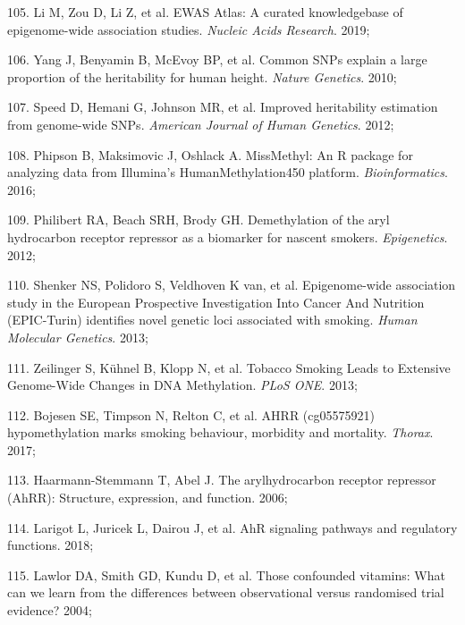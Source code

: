 \documentclass[11pt,oneside]{bristolthesis}
\newenvironment{cslreferences}%
  {}%
  {\par}
\begin{document}
\begin{cslreferences}
\leavevmode\hypertarget{ref-Li2019}{}%
105. Li M, Zou D, Li Z, et al. EWAS Atlas: A curated knowledgebase of epigenome-wide association studies. \emph{Nucleic Acids Research}. 2019;

\leavevmode\hypertarget{ref-Yang2010}{}%
106. Yang J, Benyamin B, McEvoy BP, et al. Common SNPs explain a large proportion of the heritability for human height. \emph{Nature Genetics}. 2010;

\leavevmode\hypertarget{ref-Speed2012}{}%
107. Speed D, Hemani G, Johnson MR, et al. Improved heritability estimation from genome-wide SNPs. \emph{American Journal of Human Genetics}. 2012;

\leavevmode\hypertarget{ref-Phipson2016}{}%
108. Phipson B, Maksimovic J, Oshlack A. MissMethyl: An R package for analyzing data from Illumina's HumanMethylation450 platform. \emph{Bioinformatics}. 2016;

\leavevmode\hypertarget{ref-Philibert2012}{}%
109. Philibert RA, Beach SRH, Brody GH. Demethylation of the aryl hydrocarbon receptor repressor as a biomarker for nascent smokers. \emph{Epigenetics}. 2012;

\leavevmode\hypertarget{ref-Shenker2013}{}%
110. Shenker NS, Polidoro S, Veldhoven K van, et al. Epigenome-wide association study in the European Prospective Investigation Into Cancer And Nutrition (EPIC-Turin) identifies novel genetic loci associated with smoking. \emph{Human Molecular Genetics}. 2013;

\leavevmode\hypertarget{ref-Zeilinger2013}{}%
111. Zeilinger S, Kühnel B, Klopp N, et al. Tobacco Smoking Leads to Extensive Genome-Wide Changes in DNA Methylation. \emph{PLoS ONE}. 2013;

\leavevmode\hypertarget{ref-Bojesen2017}{}%
112. Bojesen SE, Timpson N, Relton C, et al. AHRR (cg05575921) hypomethylation marks smoking behaviour, morbidity and mortality. \emph{Thorax}. 2017;

\leavevmode\hypertarget{ref-Haarmann-Stemmann2006}{}%
113. Haarmann-Stemmann T, Abel J. The arylhydrocarbon receptor repressor (AhRR): Structure, expression, and function. 2006;

\leavevmode\hypertarget{ref-Larigot2018}{}%
114. Larigot L, Juricek L, Dairou J, et al. AhR signaling pathways and regulatory functions. 2018;

\leavevmode\hypertarget{ref-Lawlor2004}{}%
115. Lawlor DA, Smith GD, Kundu D, et al. Those confounded vitamins: What can we learn from the differences between observational versus randomised trial evidence? 2004;


\end{cslreferences}
\end{document}
